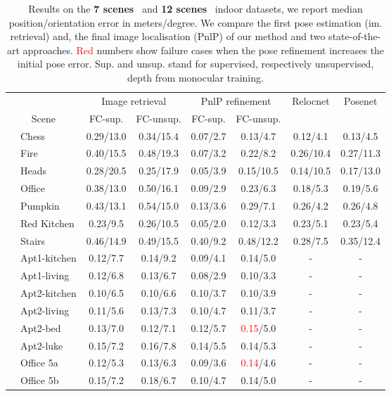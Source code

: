\begin{table}
	\centering
	\begin{scriptsize}
	\begin{tabular}{c l | c c | c c | c c }
						&		&	\multicolumn{2}{c|}{Image retrieval} & \multicolumn{2}{c|}{PnlP refinement} & Relocnet & Posenet  \\
		\multicolumn{2}{c|}{Scene} 	&	 FC-sup.	  & FC-unsup. & FC-sup.	& FC-unsup.  & \citep{Balntas2018} & \citep{Kendall2017} \\
		\hline	
	\multirow{7}{*}{\rotatebox{90}{7-Scenes~\citep{Shotton2013}}}
	&		Chess 	&  0.29/13.0 	& 0.34/15.4	& 0.07/2.7 & 0.13/4.7 & 0.12/4.1 & 0.13/4.5	\\
	&		Fire	&  0.40/15.5 	& 0.48/19.3	& 0.07/3.2 & 0.22/8.2 & 0.26/10.4 &	0.27/11.3	\\
	&		Heads	&  0.28/20.5    & 0.25/17.9	& 0.05/3.9 & 0.15/10.5 & 0.14/10.5 & 0.17/13.0		\\
	&		Office  &  0.38/13.0    & 0.50/16.1	& 0.09/2.9 & 0.23/6.3 & 0.18/5.3 & 0.19/5.6		\\
	&		Pumpkin &  0.43/13.1	& 0.54/15.0	& 0.13/3.6 & 0.29/7.1 & 0.26/4.2 & 0.26/4.8		\\
	&		Red Kitchen & 0.23/9.5  & 0.26/10.5	& 0.05/2.0 & 0.12/3.3 & 0.23/5.1 & 0.23/5.4		\\
	&		Stairs  &	0.46/14.9	& 0.49/15.5	& 0.40/9.2 & 0.48/12.2 & 0.28/7.5 & 0.35/12.4	\\[1pt]
	\hline
	\multirow{8}{*}{\rotatebox{90}{12-Scenes~\citep{Valentin2016}}} 
	& Apt1-kitchen 	& 0.12/7.7 & 0.14/9.2 & 0.09/4.1 & 0.14/5.0 & - & - \\
	& Apt1-living 	& 0.12/6.8 & 0.13/6.7 & 0.08/2.9 & 0.10/3.3 & - & - \\
	& Apt2-kitchen 	& 0.10/6.5 & 0.10/6.6 & 0.10/3.7 & 0.10/3.9 & - & - \\
	& Apt2-living 	& 0.11/5.6 & 0.13/7.3 & 0.10/4.7 & 0.11/3.7 & - & - \\
	& Apt2-bed 		& 0.13/7.0 & 0.12/7.1 & 0.12/5.7 &\textcolor{red}{0.15}/5.0 & - & - \\
	& Apt2-luke 	& 0.15/7.2 & 0.16/7.8 & 0.14/5.5 & 0.14/5.3 & - & - \\
	& Office 5a	    & 0.12/5.3 & 0.13/6.3 & 0.09/3.6 & \textcolor{red}{0.14}/4.6 & - & - \\
	& Office 5b 	& 0.15/7.2 & 0.18/6.7 & 0.10/4.7 & 0.14/5.0 & - & - \\
	\end{tabular}
	\end{scriptsize}
	\caption[Pose refinement on indoor datasets]{\label{tab:7_scenes} Results on the \textbf{7 scenes}~\citep{Shotton2013} and \textbf{12 scenes}~\citep{Valentin2016} indoor datasets, we report median position/orientation error in meters/degree. We compare the first pose estimation (im. retrieval) and, the final image localisation (PnlP) of our method and two state-of-the-art approaches. \textcolor{red}{Red} numbers show failure cases when the pose refinement increases the initial pose error. Sup. and unsup. stand for supervised, respectively unsupervised, depth from monocular training.}
\end{table}
